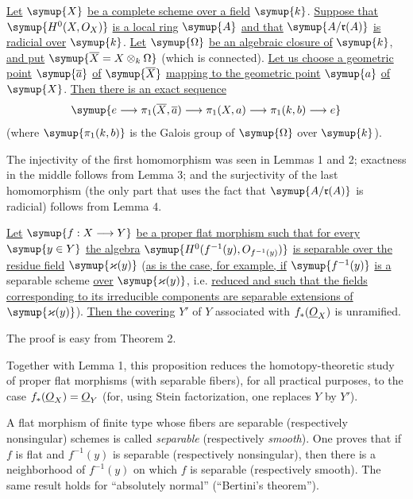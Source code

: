  \uline{Let} $\symup{X}$ \uline{be a complete scheme over a field} $\symup{k}$. \uline{Suppose that}
$\symup{H^0(X,O_X)}$ \uline{is a local ring} $\symup{A}$ \uline{and that} $\symup{A/\mathfrak r(A)}$ \uline{is radicial
over} $\symup{k}$. \uline{Let} $\symup{\Omega}$ \uline{be an algebraic closure of} $\symup{k}$, \uline{and put}
$\symup{\overline X=X\otimes_k\Omega}$ (which is connected). \uline{Let us choose a geometric point}
$\symup{\overline a}$ \uline{of} $\symup{\overline X}$ \uline{mapping to the geometric point} $\symup{a}$ \uline{of} $\symup{X}$.
\uline{Then there is an exact sequence}
\[
  \symup{e\longrightarrow\pi_1(\overline X,\overline a)
  \longrightarrow\pi_1(X,a)
  \longrightarrow\pi_1(k,b)\longrightarrow e}
\]
(where $\symup{\pi_1(k,b)}$ is the Galois group of $\symup{\Omega}$ over $\symup{k}$).

The injectivity of the first homomorphism was seen in Lemmas 1 and 2;
exactness in the middle follows from Lemma 3; and the surjectivity of the last
homomorphism (the only part that uses the fact that $\symup{A/\mathfrak r(A)}$ is
radicial) follows from Lemma 4.

 \uline{Let} $\symup{f:X\longrightarrow Y}$ \uline{be a proper flat morphism
such that for every} $\symup{y\in Y}$ \uline{the algebra}
$\symup{H^0(f^{-1}(y),O_{f^{-1}(y)})}$ \uline{is separable over the residue field}
$\symup{\varkappa(y)}$ (\uline{as is the case, for example, if} $\symup{f^{-1}(y)}$ \uline{is a} separable scheme
\uline{over} $\symup{\varkappa(y)}$, i.e. \uline{reduced and such that the fields corresponding to its
irreducible components are separable extensions of} $\symup{\varkappa(y)}$). \uline{Then the
covering}
$Y'$ of $Y$ associated with $f_*(\underline{O}_X)$ is unramified.

The proof is easy from Theorem 2.


Together with Lemma 1, this proposition reduces the homotopy-theoretic study
of proper flat morphisms (with separable fibers), for all practical purposes,
to the case $f_*(\underline{O}_X)=\underline{O}_Y$ (for, using Stein factorization, one replaces
$Y$ by $Y'$).

 A flat morphism of finite type whose fibers are separable
(respectively nonsingular) schemes is called \emph{separable} (respectively
\emph{smooth}). One proves that if $f$ is flat and $f^{-1}(y)$ is separable
(respectively nonsingular), then there is a neighborhood of $f^{-1}(y)$ on
which $f$ is separable (respectively smooth). The same result holds for
“absolutely normal” (“Bertini's theorem”).

